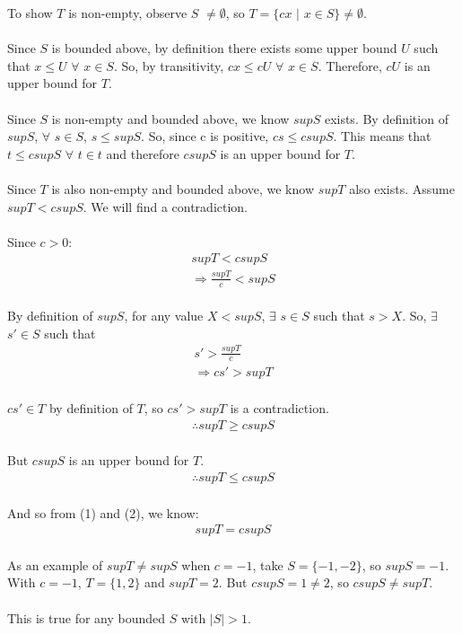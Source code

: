 \documentclass{article}
\begin{document}
\solution
To show \(T\) is non-empty, observe \(S\) \(\neq \emptyset\), so \(T = \{cx\) \(|\) \(x \in S\} \neq \emptyset\).
\\
\\
Since \(S\) is bounded above, by definition there exists some upper bound \(U\) such that \(x \leq U\) \(\forall\) \(x \in S\). So, by transitivity, \(cx \leq cU\) \(\forall\) \(x \in S\). Therefore, \(cU\) is an upper bound for \(T\).
\\
\\
Since \(S\) is non-empty and bounded above, we know \(supS\) exists. By definition of \(supS\), \(\forall\) \(s \in S\), \(s \leq supS\). So, since c is positive, \(cs \leq csupS\). This means that \(t \leq csupS\) \(\forall\) \(t \in t\) and therefore \(csupS\) is an upper bound for \(T\).
\\
\\
Since \(T\) is also non-empty and bounded above, we know \(supT\) also exists. Assume \(supT < csupS\). We will find a contradiction.
\\
\\
Since \(c > 0\):
\begin{align}
  \label{}
  supT < csupS \nonumber \\
  \Rightarrow \frac{supT}{c} < supS\nonumber
\end{align}
\\
By definition of \(supS\), for any value \(X < supS\), \(\exists\) \(s \in S\) such that \(s>X\). So, \(\exists\) \(s' \in S\) such that
\begin{align}
  \label{}
  s' > \frac{supT}{c} \nonumber \\
  \Rightarrow cs' > supT \nonumber
\end{align}
\\
\(cs' \in T\) by definition of \(T\), so \(cs' > supT\) is a contradiction.
\\
\begin{align}
  \label{}
  \therefore supT \geq csupS
\end{align}
\\
But \(csupS\) is an upper bound for \(T\).
\begin{align}
  \label{}
  \therefore supT \leq csupS
\end{align}
\\
And so from (1) and (2), we know:
\begin{align}
  \label{}
  supT = csupS \nonumber
\end{align}
\\
As an example of \(supT \neq supS\) when \(c=-1\), take \(S = \{-1,-2\}\), so \(supS = -1\). With \(c=-1\), \(T = \{1,2\}\) and \(supT = 2\). But \(csupS = 1 \neq 2\), so \(csupS \neq supT\).
\\
\\
This is true for any bounded \(S\) with \(|S| > 1\).
\\
\end{document}
